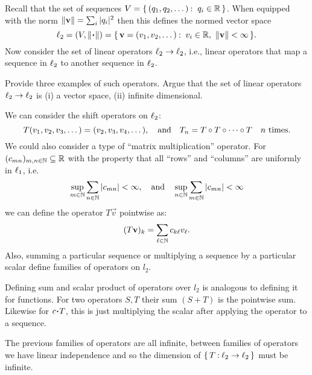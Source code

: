 \documentclass[12pt]{memoir}
\begin{document}
\begin{Ej}[Operators on $\l_2$]
    Recall that the set of sequences $V=\{\,(q_1,q_2,\dots)\mathbin{:}\ q_i\in\mathbb{R}\,\}$. When equipped with the norm $\norm{\mathbf{v}}=\sum_i|q_i|^2$ then this defines the normed vector space
    $$\l_2=(V,\norm{\.})=\set{\vec v=(v_1,v_2,\dots)\:\ v_i\in\bR,\ \norm{\vec v}<\infty}.$$
    Now consider the set of linear operators $\ell_2\to\ell_2$, i.e., linear operators that map a sequence in $\l_2$ to
another sequence in $\l_2$.\par
Provide three examples of such operators. Argue that the set of linear operators $\ell_2\to\ell_2$ is (i) a vector space, (ii) infinite dimensional.
\end{Ej}

\begin{ptcbr}
We can consider the shift operators on $\l_2$: 
$$T(v_1,v_2,v_3,\dots)=(v_2,v_3,v_4,\dots),\quad\text{and}\quad T_n=T\circ T\circ\dots\circ T\quad n\ \text{times}.$$
We could also consider a type of ``matrix multiplication'' operator. For $(c_{mn})_{m,n\in\mathbb{N}}\subseteq\mathbb{R}$ with the property that all ``rows'' and ``columns'' are uniformly in $\ell_1$, i.e.
$$\sup_{m\in\mathbb{N}}\sum_{n\in\mathbb{N}}|c_{mn}|<\infty,\quad\text{and}\quad\sup_{n\in\mathbb{N}}\sum_{m\in\mathbb{N}}|c_{mn}|<\infty$$
we can define the operator $T\vec v$ pointwise as:
$$(T\mathbf{v})_k=\sum_{\ell\in\mathbb{N}}c_{k\ell} v_\ell.$$
Also, summing a particular sequence or multiplying a sequence by a particular scalar define families of operators on $l_2$.\par 
Defining sum and scalar product of operators over $l_2$ is analogous to defining it for functions. For two operators $S,T$ their sum $(S+T)$ is the pointwise sum. Likewise for $c\.T$, this is just multiplying the scalar after applying the operator to a sequence.\par 
The previous families of operators are all infinite, between families of operators we have linear independence and so the dimension of $\{\,T\mathbin{:}\ell_2\to\ell_2\,\}$ must be infinite. 

\end{ptcbr}
\end{document}
